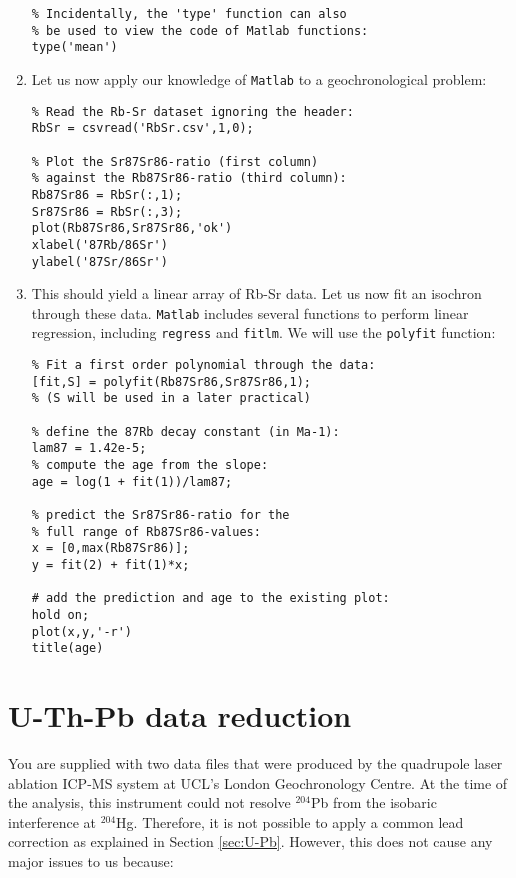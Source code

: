 \documentclass{book}
\begin{document}
\begin{enumerate}
\begin{verbatim}
% Incidentally, the 'type' function can also 
% be used to view the code of Matlab functions:
type('mean')
\end{verbatim}

\item Let us now apply our knowledge of \texttt{Matlab} to a
  geochronological problem:

\begin{verbatim}
% Read the Rb-Sr dataset ignoring the header:
RbSr = csvread('RbSr.csv',1,0);

% Plot the Sr87Sr86-ratio (first column)
% against the Rb87Sr86-ratio (third column):
Rb87Sr86 = RbSr(:,1);
Sr87Sr86 = RbSr(:,3);
plot(Rb87Sr86,Sr87Sr86,'ok')
xlabel('87Rb/86Sr')
ylabel('87Sr/86Sr')
\end{verbatim}

\item This should yield a linear array of Rb-Sr data. Let us now fit
  an isochron through these data. \texttt{Matlab} includes several
  functions to perform linear regression, including \texttt{regress}
  and \texttt{fitlm}. We will use the \texttt{polyfit} function:

\begin{verbatim}
% Fit a first order polynomial through the data:
[fit,S] = polyfit(Rb87Sr86,Sr87Sr86,1);
% (S will be used in a later practical)

% define the 87Rb decay constant (in Ma-1):
lam87 = 1.42e-5;
% compute the age from the slope:
age = log(1 + fit(1))/lam87;

% predict the Sr87Sr86-ratio for the
% full range of Rb87Sr86-values:
x = [0,max(Rb87Sr86)];
y = fit(2) + fit(1)*x;

# add the prediction and age to the existing plot:
hold on;
plot(x,y,'-r')
title(age)
\end{verbatim}

\end{enumerate}

\section{U-Th-Pb data reduction}
\label{sec:U-Pb-R}

You are supplied with two data files that were produced by the
quadrupole laser ablation ICP-MS system at UCL's London Geochronology
Centre. At the time of the analysis, this instrument could not resolve
$^{204}$Pb from the isobaric interference at $^{204}$Hg. Therefore, it
is not possible to apply a common lead correction as explained in
Section \ref{sec:U-Pb}. However, this does not cause any major issues
to us because:
\end{document}
